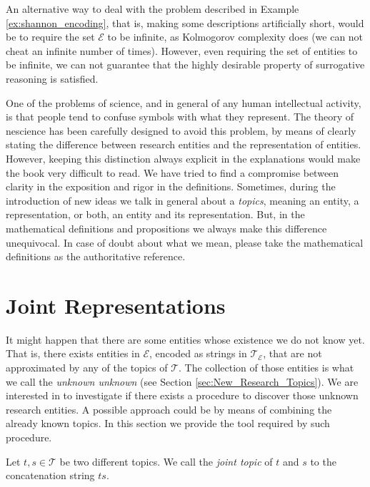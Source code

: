 An alternative way to deal with the problem described in Example \ref{ex:shannon_encoding}, that is, making some descriptions artificially short, would be to require the set $\mathcal{E}$ to be infinite, as Kolmogorov complexity does (we can not cheat an infinite number of times). However, even requiring the set of entities to be infinite, we can not guarantee that the highly desirable property of surrogative reasoning is satisfied.

\begin{remark}
One of the problems of science, and in general of any human intellectual activity, is that people tend to confuse symbols with what they represent. The theory of nescience has been carefully designed to avoid this problem, by means of clearly stating the difference between research entities and the representation of entities. However, keeping this distinction always explicit in the explanations would make the book very difficult to read. We have tried to find a compromise between clarity in the exposition and rigor in the definitions. Sometimes, during the introduction of new ideas we talk in general about a \emph{topics}, meaning an entity, a representation, or both, an entity and its representation. But, in the mathematical definitions and propositions we always make this difference unequivocal. In case of doubt about what we mean, please take the mathematical definitions as the authoritative reference. 
\end{remark}

%
%

\section{Joint Representations}
\label{sec:descriptions_joint_topic}

It might happen that there are some entities whose existence we do not know yet. That is, there exists entities in $\mathcal{E}$, encoded as strings in $\mathcal{T}_\mathcal{E}$, that are not approximated by any of the topics of $\mathcal{T}$. The collection of those entities is what we call the \emph{unknown unknown} (see Section \ref{sec:New_Research_Topics}). We are interested in to investigate if there exists a procedure to discover those unknown research entities. A possible approach could be by means of combining the already known topics. In this section we provide the tool required by such procedure.

\begin{definition}
Let $t, s \in \mathcal{T}$ be two different topics. We call the \emph{joint topic} of $t$ and $s$ to the concatenation string $ts$.
\end{definition}

